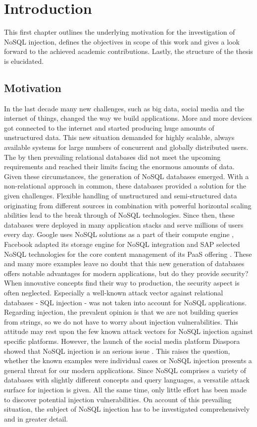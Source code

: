\chapter{Introduction}
\label{cha:introduction}
This first chapter outlines the underlying motivation for the investigation of NoSQL injection, defines the objectives in scope of this work and gives a look forward to the achieved academic contributions. Lastly, the structure of the thesis is elucidated.

\section{Motivation}
In the last decade many new challenges, such as big data, social media and the internet of things, changed the way we build applications. More and more devices got connected to the internet and started producing huge amounts of unstructured data. This new situation demanded for highly scalable, always available systems for large numbers of concurrent and globally distributed users. The by then prevailing relational databases did not meet the upcoming requirements and reached their limits facing the enormous amounts of data. Given these circumstances, the generation of NoSQL databases emerged. With a non-relational approach in common, these databases provided a solution for the given challenges. Flexible handling of unstructured and semi-structured data originating from different sources in combination with powerful horizontal scaling abilities lead to the break through of NoSQL technologies. Since then, these databases were deployed in many application stacks and serve millions of users every day. Google uses NoSQL solutions as a part of their compute engine \cite{MongoDB_Google:2016}, Facebook adapted its storage engine for NoSQL integration \cite{MongoDB_Facebook:2016} and SAP selected NoSQL technologies for the core content management of its PaaS offering \cite{MongoDB_SAP:2016}. These and many more examples leave no doubt that this new generation of databases offers notable advantages for modern applications, but do they provide security? When innovative concepts find their way to production, the security aspect is often neglected. Especially a well-known attack vector against relational databases - SQL injection - was not taken into account for NoSQL applications. Regarding injection, the prevalent opinion is that we are not building queries from strings, so we do not have to worry about injection vulnerabilities. This attitude may rest upon the few known attack vectors for NoSQL injection against specific platforms. However, the launch of the social media platform Diaspora showed that NoSQL injection is an serious issue \cite{McKenzie:2010}. This raises the question, whether the known examples were individual cases or NoSQL injection presents a general threat for our modern applications. Since NoSQL comprises a variety of databases with slightly different concepts and query languages, a versatile attack surface for injection is given. All the same time, only little effort has been made to discover potential injection vulnerabilities. On account of this prevailing situation, the subject of NoSQL injection has to be investigated comprehensively and in greater detail.

